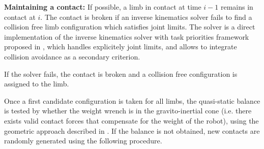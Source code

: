 \medskip%
\noindent\textbf{Maintaining a contact:} If possible, a limb in contact at time $i-1$ remains in contact at $i$. The contact is broken if an inverse kinematics solver fails to find a collision free limb configuration which satisfies joint limits.
The solver is a direct implementation of the inverse kinematics solver with task priorities framework proposed in \cite{Baerlocher2004}, which
handles explicitely joint limits, and allows to integrate collision avoidance as a secondary criterion.

If the solver fails, the contact is broken and a collision free configuration is assigned to the limb.

Once a first candidate configuration is taken for all limbs, the quasi-static balance is tested by whether the weight wrench is in the gravito-inertial cone (i.e. there exists valid contact forces that compensate for the weight of the robot), using the geometric approach described in \cite{qiu:dhm:2011}. If the balance is not obtained, new contacts are randomly generated using the following procedure.

%

